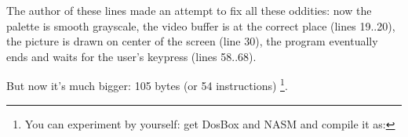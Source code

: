 


The author of these lines made an attempt to fix all these oddities: now the palette is smooth grayscale, the video buffer is at the correct place 
(lines 19..20),
the picture is drawn on center of the screen (line 30), the program eventually ends and waits for the user's keypress 
(lines 58..68).

But now it's much bigger: 105 bytes (or 54 instructions)
\footnote{
You can experiment by yourself: get DosBox and NASM and compile it as: 
}.

\begin{figure}[H]
\centering
{}
\caption{\MyFixedVersion}
\label{fig:mandelbrot_fixed}
\end{figure}
